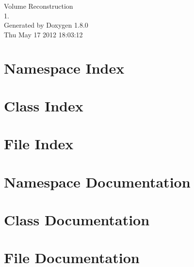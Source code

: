 \documentclass{book}
\begin{document}
\hypersetup{pageanchor=false,citecolor=blue}
\begin{titlepage}
\vspace*{7cm}
\begin{center}
{\Large Volume Reconstruction \\[1ex]\large 1. }\\
\vspace*{1cm}
{\large Generated by Doxygen 1.8.0}\\
\vspace*{0.5cm}
{\small Thu May 17 2012 18:03:12}\\
\end{center}
\end{titlepage}
\clearemptydoublepage
{}
\tableofcontents
\clearemptydoublepage
{}
\hypersetup{pageanchor=true,citecolor=blue}
\chapter{Namespace Index}

\chapter{Class Index}

\chapter{File Index}

\chapter{Namespace Documentation}

\chapter{Class Documentation}







\chapter{File Documentation}















\printindex
\end{document}

